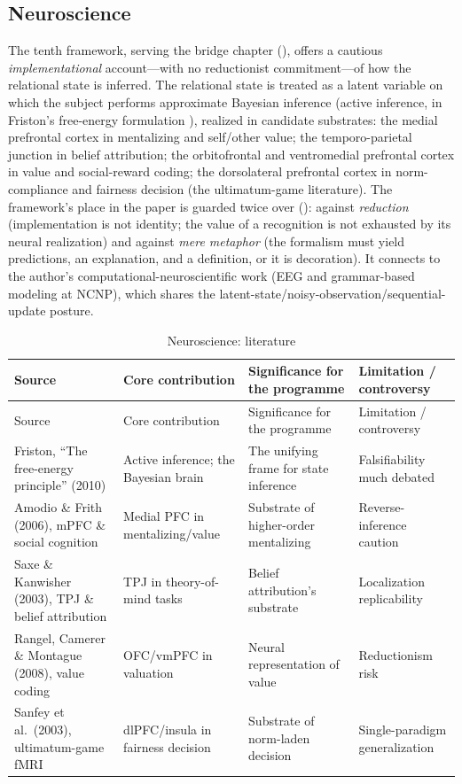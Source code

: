 \subsection{Neuroscience}
The tenth framework, serving the bridge chapter (), offers a cautious \emph{implementational} account---with no reductionist commitment---of how the relational state is inferred. The relational state is treated as a latent variable on which the subject performs approximate Bayesian inference (active inference, in Friston's free-energy formulation \parencite{friston2010fep,friston2017process,parr2022active}), realized in candidate substrates: the medial prefrontal cortex in mentalizing and self/other value; the temporo-parietal junction in belief attribution; the orbitofrontal and ventromedial prefrontal cortex in value and social-reward coding; the dorsolateral prefrontal cortex in norm-compliance and fairness decision (the ultimatum-game literature). The framework's place in the paper is guarded twice over (): against \emph{reduction} (implementation is not identity; the value of a recognition is not exhausted by its neural realization) and against \emph{mere metaphor} (the formalism must yield predictions, an explanation, and a definition, or it is decoration). It connects to the author's computational-neuroscientific work (EEG and grammar-based modeling at NCNP), which shares the latent-state/noisy-observation/sequential-update posture.

\goldrule
\footnotesize
\begin{longtable}{Y Y Y Y}
\caption{Neuroscience: literature}\label{p07:tab:lit-neuro}\\
\toprule
{}
Source & Core contribution & Significance for the programme & Limitation / controversy \\
\midrule
\endfirsthead
{}
Source & Core contribution & Significance for the programme & Limitation / controversy \\
\midrule
\endhead
Friston, ``The free-energy principle'' (2010) & Active inference; the Bayesian brain & The unifying frame for state inference & Falsifiability much debated \\
Amodio \& Frith (2006), mPFC \& social cognition & Medial PFC in mentalizing/value & Substrate of higher-order mentalizing & Reverse-inference caution \\
Saxe \& Kanwisher (2003), TPJ \& belief attribution & TPJ in theory-of-mind tasks & Belief attribution's substrate & Localization replicability \\
Rangel, Camerer \& Montague (2008), value coding & OFC/vmPFC in valuation & Neural representation of value & Reductionism risk \\
Sanfey et al.\ (2003), ultimatum-game fMRI & dlPFC/insula in fairness decision & Substrate of norm-laden decision & Single-paradigm generalization \\
\bottomrule
\end{longtable}

